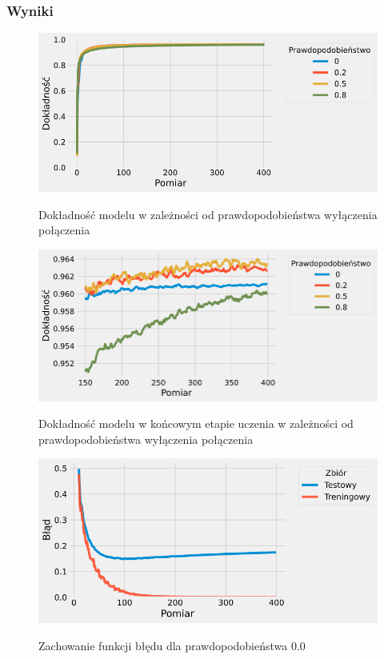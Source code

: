 \documentclass{article}
\begin{document}
\subsubsection*{Wyniki}
\begin{figure}[H]
	\centering
	\caption{Dokładność modelu w zależności od prawdopodobieństwa wyłączenia połączenia}
	\includegraphics[width=\textwidth]{drop_acc.png}
	\label{fig:res11}
\end{figure}
\begin{figure}[H]
	\centering
	\caption{Dokładność modelu w końcowym etapie uczenia w zależności od prawdopodobieństwa wyłączenia połączenia}
	\includegraphics[width=\textwidth]{drop_acc_zoom.png}
	\label{fig:res12}
\end{figure}
\begin{figure}[H]
	\centering
	\caption{Zachowanie funkcji błędu dla prawdopodobieństwa 0.0}
	\includegraphics[width=\textwidth]{drop_err_0.png}
	\label{fig:res13}
\end{figure}
\end{document}
